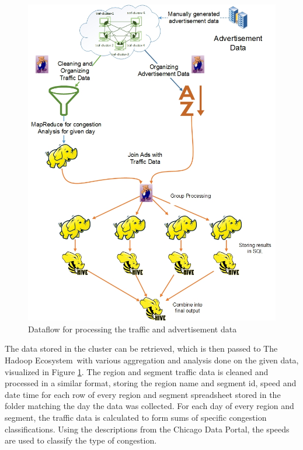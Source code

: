 \documentclass[titlepage,twocolumn]{article}
\newcommand{\HadoopEcosystem}{Hadoop Ecosystem}
\begin{document}
\begin{figure}[ht]
	\centering
	\includegraphics[scale=.45]{FinalCleaningAndProcessing.jpg}
	\caption{\small Dataflow for processing the traffic and advertisement data}
	\label{fig:DataProcessing}
\end{figure}

\par The data stored in the cluster can  be retrieved, which is then passed to The \HadoopEcosystem\ with various aggregation and analysis done on the given data, visualized in Figure \ref{fig:DataProcessing}. The region and segment traffic data is cleaned and processed in a similar format, storing the region name and segment id, speed and date time for each row of every region and segment spreadsheet stored in the folder matching the day the data was collected. For each day of every region and segment, the traffic data is calculated to form sums of specific congestion classifications. Using the descriptions from the Chicago Data Portal, the speeds are used to classify the type of congestion. 
\end{document}
